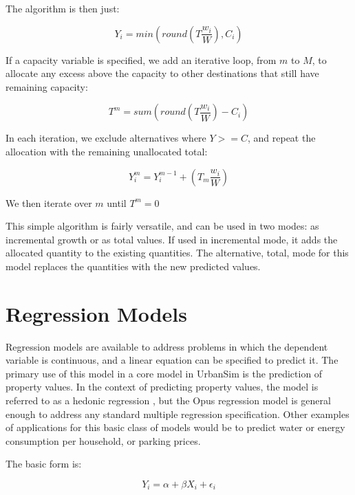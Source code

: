 The algorithm is then just:

\begin{equation}
Y_i = min(round(T\frac{w_i}{W}),C_i)
\end{equation}

If a capacity variable is specified, we add an iterative
loop, from $m$ to $M$, to allocate any excess above the
capacity to other destinations that still have remaining
capacity:

\begin{equation}
T^m = sum(round(T\frac{w_i}{W}) - C_i)
\end{equation}

In each iteration, we exclude alternatives where $Y>=C$, and
repeat the allocation with the remaining unallocated total:

\begin{equation}
Y^m_i = Y^{m-1}_i + (T_m\frac{w_i}{W})
\end{equation}

We then iterate over $m$ until $T^m = 0$ 

This simple algorithm is fairly versatile, and can be used
in two modes: as incremental growth or as total values. If
used in incremental mode, it adds the allocated quantity to
the existing quantities.  The alternative, total, mode for
this model replaces the quantities with the new predicted
values.

\section{Regression Models}
%
\label{sec:components-regression-model}


Regression models are available to address problems in which
the dependent variable is continuous, and a linear equation
can be specified to predict it.  The primary use of this
model in a core model in UrbanSim is the prediction of
property values.  In the context of predicting property
values, the model is referred to as a hedonic regression
\cite{waddell-hedonic-1993}, but the Opus regression model
is general enough to address any standard multiple
regression specification.  Other examples of applications
for this basic class of models would be to predict water or
energy consumption per household, or parking prices.

The basic form is:

\begin{equation}
Y_i = \alpha + \beta X_i + \epsilon_i
\end{equation}

